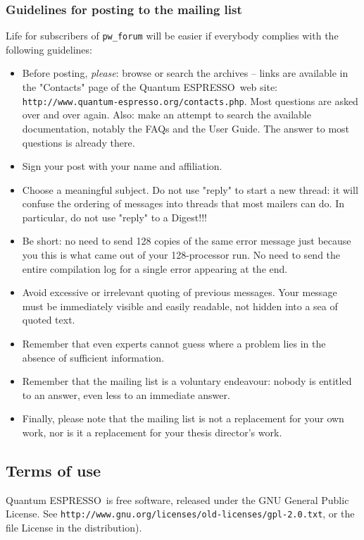 \documentclass[12pt,a4paper]{article}
\def\qe{{\sc Quantum ESPRESSO}}
\begin{document}
\subsubsection{Guidelines for posting to the mailing list}
\label{SubSec:Guidelines}
Life for subscribers of \texttt{pw\_forum} will be easier if everybody 
complies with the following guidelines:
\begin{itemize}
\item Before posting, {\em please}: browse or search the archives -- 
  links are available in the "Contacts" page  of the \qe\ web site:\\
  \texttt{http://www.quantum-espresso.org/contacts.php}. Most questions 
  are asked over and over again. Also: make an attempt to search the
  available documentation, notably the FAQs and the User Guide.
  The answer to most questions is already there.
\item Sign your post with your name and affiliation.
\item Choose a meaningful subject. Do not use "reply" to start a new
  thread:
  it will confuse the ordering of messages into threads that most mailers
  can do. In particular, do not use "reply" to a Digest!!!
\item Be short: no need to send 128 copies of the same error message just
  because you this is what came out of your 128-processor run. No need to
  send the entire compilation log for a single error appearing at the end.
\item Avoid excessive or irrelevant quoting of previous messages. Your
  message must be immediately visible and easily readable, not hidden
  into a sea of quoted text.
\item Remember that even experts cannot guess where a problem lies in
  the absence of sufficient information.
\item Remember that the mailing list is a voluntary endeavour: nobody is 
  entitled to an answer, even less to an immediate answer.
\item Finally, please note that the mailing list is not a replacement
  for your own work, nor is it a replacement for your thesis director's work.
\end{itemize}
 
\subsection{Terms of use}

\qe\ is free software, released under the 
GNU General Public License. See
\texttt{http://www.gnu.org/licenses/old-licenses/gpl-2.0.txt}, 
or the file License in the distribution).
    
\end{document}
